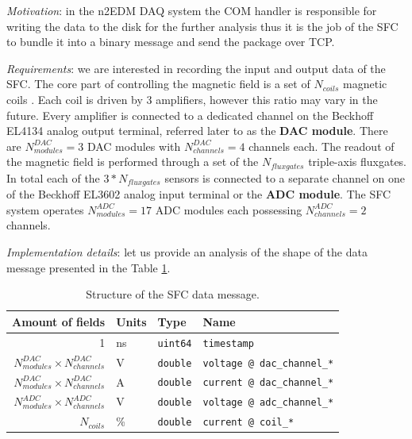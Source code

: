 \textit{Motivation}: in the n2EDM DAQ system the COM handler is responsible for writing the data to the disk for the further analysis thus it is the job of the SFC to bundle it into a binary message and send the package over TCP.

\textit{Requirements}: we are interested in recording the input and output data of the SFC. The core part of controlling the magnetic field is a set of $N_{coils}$ magnetic coils \cite{Rawlik2018}. Each coil is driven by 3 amplifiers, however this ratio may vary in the future. Every amplifier is connected to a dedicated channel on the Beckhoff EL4134 \cite{BeckhoffDAC2019} analog output terminal, referred later to as the \textbf{DAC module}. There are $N_{modules}^{DAC} = 3$ DAC modules with $N_{channels}^{DAC} = 4$ channels each. The readout of the magnetic field is performed through a set of the $N_{fluxgates}$ triple-axis fluxgates. In total each of the $3 * N_{fluxgates}$ sensors is connected to a separate channel on one of the Beckhoff EL3602 \cite{BeckhoffADC2019} analog input terminal or the \textbf{ADC module}. The SFC system operates $N_{modules}^{ADC} = 17$ ADC modules each possessing $N_{channels}^{ADC} = 2$ channels. 

\textit{Implementation details}: let us provide an analysis of the shape of the data message presented in the Table \ref{tbl:sfc_data_message}.

\renewcommand{\arraystretch}{1.4}
\begin{table}[h]
\centering
\begin{tabular}{|r|l|l|l|}
	\hline
	Amount of fields & Units & Type & Name \\
	\hline \hline
	1 & ns & \texttt{uint64} & \texttt{timestamp} \\
	\hline
	$N_{modules}^{DAC} \times N_{channels}^{DAC}$ & V & \texttt{double} & \texttt{voltage @ dac\_channel\_*} \\
	\hline
	$N_{modules}^{DAC} \times N_{channels}^{DAC}$ & A & \texttt{double} & \texttt{current @ dac\_channel\_*} \\
	\hline
	$N_{modules}^{ADC} \times N_{channels}^{ADC}$ & V & \texttt{double} & \texttt{voltage @ adc\_channel\_*} \\
	\hline
	$N_{coils}$ & \% & \texttt{double} & \texttt{current @ coil\_*} \\
	\hline
\end{tabular}
\caption{Structure of the SFC data message.}
\label{tbl:sfc_data_message}
\end{table}
\renewcommand{\arraystretch}{1}

